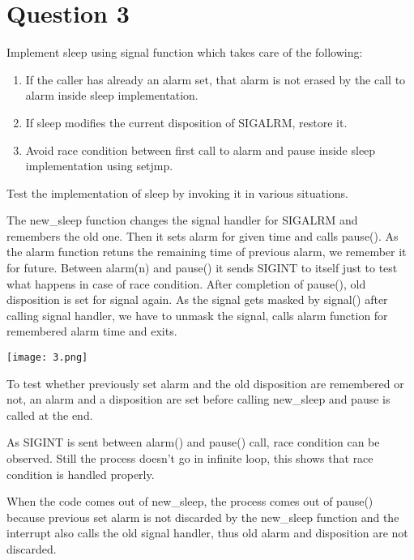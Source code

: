 \documentclass[main.tex]{subfiles}
\begin{document}
\section{Question 3}

Implement sleep using signal function which takes care of the following:
\begin{enumerate}
	\item If the caller has already an alarm set, that alarm is not erased
		by the call to alarm inside sleep implementation.
	\item If sleep modifies the current disposition of SIGALRM, restore it.
	\item Avoid race condition between first call to alarm and pause inside
		sleep implementation using setjmp.
\end{enumerate}
Test the implementation of sleep by invoking it in various situations.



The new\_sleep function changes the signal handler for SIGALRM and remembers the
old one. Then it sets alarm for given time and calls pause(). As the alarm
function retuns the remaining time of previous alarm, we remember it for future.
Between alarm(n) and pause() it sends SIGINT to itself just to test what happens
in case of race condition. After completion of pause(), old disposition is set
for signal again.  As the signal gets masked by signal() after calling signal
handler, we have to unmask the signal, calls alarm function for remembered alarm
time and exits.

\texttt{[image: 3.png]}

To test whether previously set alarm and the old disposition are remembered or
not, an alarm and a disposition are set before calling new\_sleep and pause is
called at the end.

As SIGINT is sent between alarm() and pause() call, race condition can be
observed. Still the process doesn't go in infinite loop, this shows that race
condition is handled properly.

When the code comes out of new\_sleep, the process comes out of pause() because
previous set alarm is not discarded by the new\_sleep function and the interrupt
also calls the old signal handler, thus old alarm and disposition are not
discarded.

\clearpage
\end{document}
